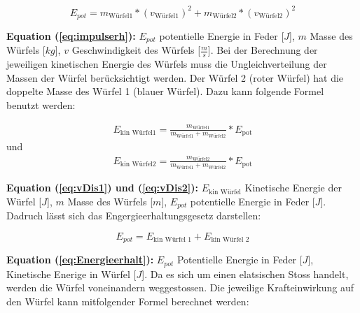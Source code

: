 \documentclass{article}
\begin{document}
\begin{equation}\label{eq:impulserh}
E_{pot} = m_{\text{Würfel1}} * (v_{\text{Würfel1}})^2 +  m_{\text{Würfel2}} * (v_{\text{Würfel2}})^2
\end{equation}

\scriptsize
\textbf{Equation (\ref{eq:impulserh}):} $E_{pot}$ potentielle Energie in Feder [$J$], $m$ Masse des Würfels [$kg$], $v$ Geschwindigkeit des Würfels [$\frac{m}{s}$].
\normalsize
\medskip
\newline
Bei der Berechnung der jeweiligen kinetischen Energie des Würfels muss die Ungleichverteilung der Massen der Würfel berücksichtigt werden. Der Würfel 2 (roter Würfel) hat die doppelte Masse des Würfel 1 (blauer Würfel).
\newline
Dazu kann folgende Formel benutzt werden:

\begin{equation}\label{eq:vDis1}
\begin{aligned}
E_{\text{kin Würfel1}} = \frac{m_{\text{Würfel1}}}{m_{\text{Würfel1}} + m_{\text{Würfel2}}} * E_{\text{pot}}
\end{aligned}
\end{equation}
und
\begin{equation}\label{eq:vDis2}
\begin{aligned}
E_{\text{kin Würfel2}} = \frac{m_{\text{Würfel2}}}{m_{\text{Würfel1}} + m_{\text{Würfel2}}} * E_{\text{pot}}
\end{aligned}
\end{equation}

\scriptsize
\textbf{Equation (\ref{eq:vDis1}) und (\ref{eq:vDis2}):} $E_{\text{kin Würfel}}$ Kinetische Energie der Würfel      [$J$], $m$ Masse des Würfels [$m$], $E_{pot}$ potentielle Energie in Feder [$J$].
\normalsize
\medskip
\newline
Dadruch lässt sich das Engergieerhaltungsgesetz darstellen:

\begin{equation}\label{eq:Energieerhalt}
E_{pot} = E_{\text{kin Würfel 1}} + E_{\text{kin Würfel 2}}
\end{equation}

\scriptsize
\textbf{Equation (\ref{eq:Energieerhalt}):} $E_{pot}$ Potentielle Energie in Feder [$J$], Kinetische Enerige in Würfel [$J$].
\normalsize
\medskip
\newline
Da es sich um einen elatsischen Stoss handelt, werden die Würfel voneinandern weggestossen.
\newline
Die jeweilige Krafteinwirkung auf den Würfel kann mitfolgender Formel berechnet werden:
\end{document}
